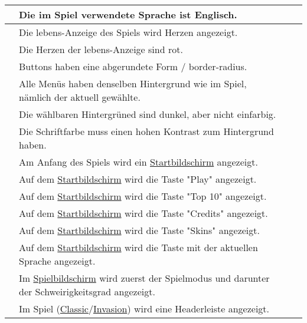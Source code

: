 \begin{xltabular}{\textwidth}{|l|X|r|r|}
      & Die im Spiel verwendete Sprache ist Englisch.             &      &      \\ \hline
      & Die \glspl{leben}-Anzeige des Spiels wird Herzen angezeigt.             &     &      \\ \hline
      & Die Herzen der \glspl{leben}-Anzeige sind rot.             &     &      \\ \hline
      & Buttons haben eine abgerundete Form / border-radius.             &      &      \\ \hline
      & Alle Menüs haben denselben Hintergrund wie im Spiel, nämlich der aktuell gewählte.             &     &      \\ \hline
      & Die wählbaren Hintergrüned sind dunkel, aber nicht einfarbig.             &     &      \\ \hline
      & Die Schriftfarbe muss einen hohen Kontrast zum Hintergrund haben. &  &  \\ \hline 
      & Am Anfang des Spiels wird ein \hyperref[fig:dia:mainMenu]{Startbildschirm} angezeigt.             &      &      \\ \hline
      & Auf dem \hyperref[fig:dia:mainMenu]{Startbildschirm} wird die Taste "Play" angezeigt.             &      &      \\ \hline
      & Auf dem \hyperref[fig:dia:mainMenu]{Startbildschirm} wird die Taste "Top 10" angezeigt.             &      &      \\ \hline
      & Auf dem \hyperref[fig:dia:mainMenu]{Startbildschirm} wird die Taste "Credits" angezeigt.             &      &      \\ \hline
      & Auf dem \hyperref[fig:dia:mainMenu]{Startbildschirm} wird die Taste "Skins" angezeigt.             &      &      \\ \hline
      & Auf dem \hyperref[fig:dia:mainMenu]{Startbildschirm} wird die Taste mit der aktuellen Sprache angezeigt.             &      &      \\ \hline
      & Im \hyperref[fig:dia:gameMode]{Spielbildschirm} wird zuerst der Spielmodus und darunter der Schweirigkeitsgrad angezeigt.             &      &      \\ \hline
      & Im Spiel (\hyperref[fig:dia:fig:dia:classic]{Classic}/\hyperref[fig:dia:invasion]{Invasion}) wird eine Headerleiste angezeigt.             &     &      \\ \hline

\end{xltabular}
